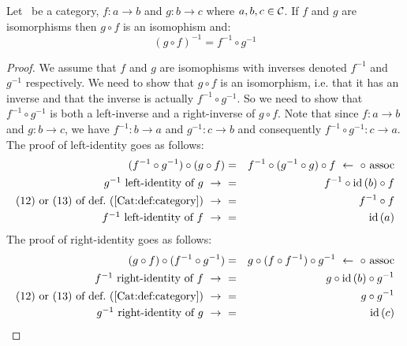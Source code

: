 \begin{prop}\label{Cat:prop:isomorphism:composition}
    Let \Cat\ be a category, $f:a\to b$ and $g:b\to c$ where $a,b,c\in\mbox{$\cal C$}$.
    If $f$ and $g$ are isomorphisms then  $g\circ f$ is an isomophism and:
        \[
            (g\circ f)^{-1} = f^{-1}\circ g^{-1}
        \]
\end{prop}
\begin{proof}
    We assume that $f$ and $g$ are isomophisms with inverses denoted 
    $f^{-1}$ and $g^{-1}$ respectively. We need to show that $g\circ f$
    is an isomorphism, i.e. that it has an inverse and that the inverse
    is actually $f^{-1}\circ g^{-1}$. So we need to show that 
    $f^{-1}\circ g^{-1}$ is both a left-inverse and a right-inverse
    of $g\circ f$. Note that since $f:a\to b$ and $g:b\to c$, we have
    $f^{-1}:b\to a$ and $g^{-1}:c\to b$ and consequently
    $f^{-1}\circ g^{-1}:c \to a$. The proof of left-identity goes as follows:
        \begin{eqnarray*}(f^{-1}\circ g^{-1})\circ(g\circ f)
            &=&f^{-1}\circ(g^{-1}\circ g)\circ f
            \ \leftarrow\ \circ\ \mbox{assoc}\\
            \mbox{$g^{-1}$ left-identity of $g$}\ \to\ 
            &=&f^{-1}\circ\id\,(b)\circ f\\
            \mbox{$(12)$ or $(13)$ of def.~(\ref{Cat:def:category})}\ \to\ 
            &=&f^{-1}\circ f\\
            \mbox{$f^{-1}$ left-identity of $f$}\ \to\ 
            &=&\id\,(a)
        \end{eqnarray*}
The proof of right-identity goes as follows:
        \begin{eqnarray*}(g\circ f)\circ(f^{-1}\circ g^{-1})
            &=&g\circ (f\circ f^{-1})\circ g^{-1}
            \ \leftarrow\ \circ\ \mbox{assoc}\\
            \mbox{$f^{-1}$ right-identity of $f$}\ \to\ 
            &=&g\circ\id\,(b)\circ g^{-1}\\
            \mbox{$(12)$ or $(13)$ of def.~(\ref{Cat:def:category})}\ \to\ 
            &=&g\circ g^{-1}\\
            \mbox{$g^{-1}$ right-identity of $g$}\ \to\ 
            &=&\id\,(c)
        \end{eqnarray*}
\end{proof}


